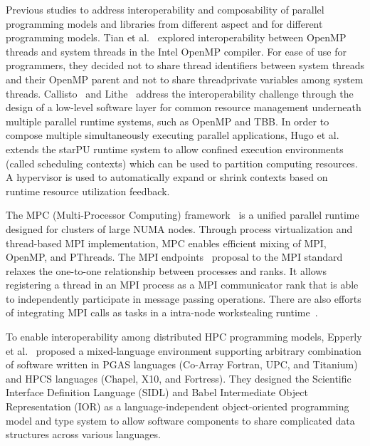 Previous studies to address interoperability and composability of parallel programming models and libraries 
from different aspect and for different programming models. 
Tian et al.~\cite{tian2003compiler} explored interoperability between OpenMP threads and system threads in the Intel OpenMP compiler.
For ease of use for programmers, they decided not to share thread identifiers between system threads and their OpenMP parent
and not to share threadprivate variables among system threads.
Callisto~\cite{Callisto:Harris:2014:CCP:2592798.2592807} and
Lithe~\cite{Lithe:Pan:2009:LEE:1855591.1855602} 
address the interoperability challenge 
through the design of a low-level software layer for common 
resource management underneath multiple parallel runtime systems, such as OpenMP and TBB. %
In order to compose multiple simultaneously executing parallel applications, Hugo et al.~\cite{hugo2014composing} extends the starPU runtime system to allow confined execution environments (called scheduling contexts) which can be used to partition computing resources. 
A hypervisor is used to automatically expand or shrink contexts based on runtime resource utilization feedback. 

The MPC (Multi-Processor Computing) framework~\cite{perache2008mpc} is a unified parallel runtime designed for clusters of large NUMA nodes. 
Through process virtualization and thread-based MPI implementation, MPC enables efficient mixing of MPI, OpenMP, and PThreads. 
The MPI endpoints~\cite{Dinan:mpiendpoint_eurompi13}
proposal to the MPI standard relaxes the one-to-one relationship between processes and ranks.
It allows registering a thread in an MPI
process as a MPI communicator rank that is able to independently participate
in message passing operations. There are also efforts of integrating MPI calls as
tasks in a intra-node workstealing runtime~\cite{hcmpi:ipdps13}.

To enable interoperability among distributed HPC programming models, Epperly et al.~\cite{epperly2011composite} proposed a mixed-language environment supporting arbitrary combination of software written in PGAS languages (Co-Array Fortran, UPC, and Titanium) and HPCS languages (Chapel, X10, and Fortress). 
They designed the Scientific Interface Definition Language (SIDL) and Babel Intermediate Object Representation (IOR) as a language-independent object-oriented programming model and type system
to allow software components to share complicated data structures across various languages. 

